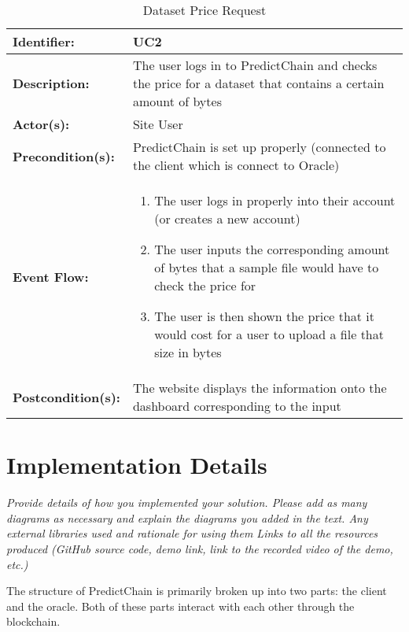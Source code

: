 \documentclass{article}
\begin{document}
    \begin{table}[H]
        \caption{Dataset Price Request}
        \label{tab:ds-price-request}
        \centering
        \begin{tabular}{|p{3cm}|p{8cm}|}
            \hline
            \textbf{Identifier:} & UC2 \\
            \hline
            \textbf{Description:} & The user logs in to PredictChain and checks the price for a dataset that contains a
            certain amount of bytes\\
            \hline
            \textbf{Actor(s):} & Site User \\
            \hline
            \textbf{Precondition(s):} & PredictChain is set up properly (connected to the client which is connect to Oracle) \\
            \hline
            \textbf{Event Flow:} &
            \begin{enumerate}
                \item The user logs in properly into their account (or creates a new account)
                \item The user inputs the corresponding amount of bytes that a sample file would have to check the price for
                \item The user is then shown the price that it would cost for a user to upload a file that size in bytes
            \end{enumerate} \\
            \hline
            \textbf{Postcondition(s):} & The website displays the information onto the dashboard corresponding to the input \\
            \hline
        \end{tabular}
    \end{table}

    \section{Implementation Details}

    \emph{Provide details of how you implemented your solution. Please add as many diagrams as necessary and explain the
    diagrams you added in the text. Any external libraries used and rationale for using them
    Links to all the resources produced (GitHub source code, demo link, link to the recorded video of the demo, etc.)}

    The structure of PredictChain is primarily broken up into two parts: the client and the oracle.  Both of these parts
    interact with each other through the blockchain.
\end{document}
